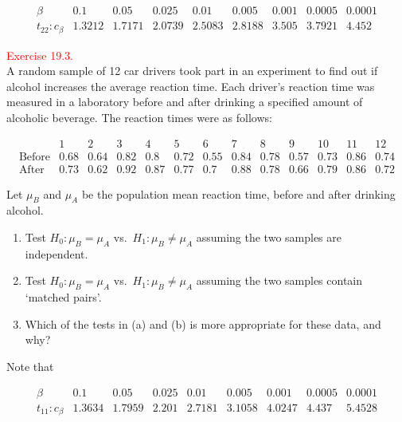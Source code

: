 \documentclass[
]{book}
\providecommand{\tightlist}{%
  \setlength{\itemsep}{0pt}\setlength{\parskip}{0pt}}
\begin{document}
\[ \begin{array}{c|c|c|c|c|c|c|c|c} \beta & 0.1 & 0.05 & 0.025 & 0.01 & 0.005 & 0.001 & 0.0005  & 0.0001 \\
\hline t_{22}: c_\beta & 1.3212 & 1.7171 & 2.0739 & 2.5083 & 2.8188 & 3.505 & 3.7921 & 4.452  \end{array}  \]

\hfill\break

\leavevmode{}%
\textcolor{red}{Exercise 19.3.}\\
A random sample of 12 car drivers took part in an experiment to find out if alcohol increases the average reaction time. Each driver's reaction time was measured in a laboratory before and after drinking a specified amount of alcoholic beverage. The reaction times were as follows:

\[
\begin{array}{l|rrrrrrrrrrrr}
      &    1 &    2 &    3 &    4 &    5 &    6 &    7 &    8 &    9 &   10 &   11 &   12\\ \hline
\mbox{Before}& 0.68 & 0.64 & 0.82 & 0.8 & 0.72 & 0.55 & 0.84 &0.78 & 0.57 & 0.73 & 0.86 & 0.74\\
\mbox{After} & 0.73 & 0.62 & 0.92 & 0.87 & 0.77 & 0.7 & 0.88 &0.78 & 0.66 & 0.79 & 0.86 & 0.72 \end{array}
\]

Let \(\mu_B\) and \(\mu_A\) be the population mean reaction time, before and after drinking alcohol.

\begin{enumerate}
\def\labelenumi{(\alph{enumi})}
\tightlist
\item
  Test \(H_0: \mu_B = \mu_A\) vs.~\(H_1: \mu_B \neq \mu_A\) assuming the two samples are independent.\\
\item
  Test \(H_0: \mu_B = \mu_A\) vs.~\(H_1: \mu_B \neq \mu_A\) assuming the two samples contain `matched pairs'.\\
\item
  Which of the tests in (a) and (b) is more appropriate for these data, and why?
\end{enumerate}

Note that

\[ \begin{array}{c|c|c|c|c|c|c|c|c} \beta & 0.1 & 0.05 & 0.025 & 0.01 & 0.005 & 0.001 & 0.0005  & 0.0001 \\
\hline t_{11}: c_\beta & 1.3634 & 1.7959 & 2.201 & 2.7181 & 3.1058 & 4.0247 & 4.437 & 5.4528  \end{array}  \]
\end{document}
